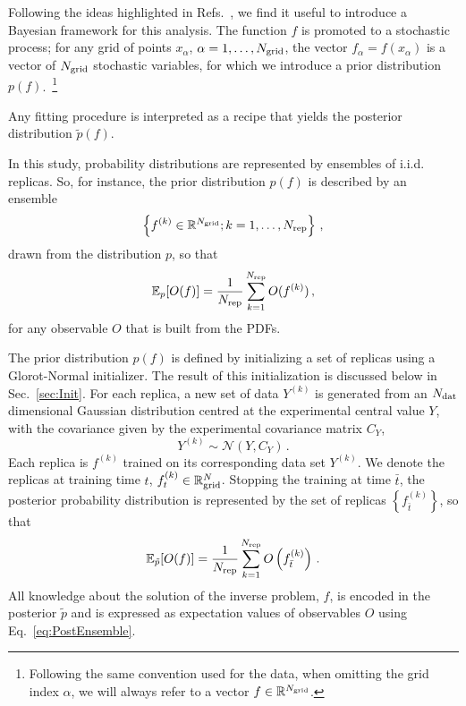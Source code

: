 \documentclass[11pt]{article}
\begin{document}
Following the ideas highlighted in Refs.~\cite{DelDebbio:2021whr,Candido:2024hjt}, we find it 
useful to introduce a Bayesian
framework for this analysis. The function $f$ is promoted to a stochastic process; for any grid 
of points $x_{\alpha}$, $\alpha=1, \ldots, N_{\mathrm{grid}}$, the vector $f_{\alpha}=f(x_{\alpha})$ is a 
vector of $N_{\mathrm{grid}}$ stochastic variables, for which we introduce a prior distribution $p(f)$.~\footnote{Following
the same convention used for the data, when omitting the grid index $\alpha$, we will always refer to a 
vector $f \in \mathbb{R}^{N_{\mathrm{grid}}}$.}

Any fitting procedure is interpreted as a recipe that yields the posterior distribution
$\tilde{p}(f)$.

In this study, probability distributions are represented by ensembles of i.i.d. replicas.
So, for instance, the prior distribution $p(f)$ is described by an ensemble 
\begin{equation}
    \label{eq:RepDef}
    \left\{f^{(k)} \in \mathbb{R}^{N_{\mathrm{grid}}}; k=1, \ldots, N_{\rm rep}\right\}\, ,
\end{equation}
drawn from the distribution $p$, so that 
\begin{equation}
    \label{eq:ReplicaEnsemble}
    \mathbb{E}_{p}[O(f)] = \frac{1}{N_{\rm rep}} \sum_{k=1}^{N_{\rm rep}} O(f^{(k)})\, ,
\end{equation}
for any observable $O$ that is built from the PDFs. 

The prior distribution $p(f)$ is defined by initializing a set of replicas using a Glorot-Normal initializer. 
The result of this initialization is discussed below in Sec.~\ref{sec:Init}.
For each replica, a new set of data $Y^{(k)}$ is generated from an $N_{\mathrm{dat}}$ dimensional Gaussian distribution
centred at the experimental central value $Y$, with the covariance given by the experimental covariance 
matrix $C_Y$, 
\begin{equation}
    \label{eq:ExpReplicaDistr}
    Y^{(k)} \sim \mathcal{N}\left(Y, C_Y\right)\, .
\end{equation}
Each replica is $f^{(k)}$ trained on its corresponding data set $Y^{(k)}$. We denote the replicas at training time $t$, 
$f^{(k)}_{t} \in \mathbb{R}^N_{\mathrm{grid}}$. Stopping the training at time $\bar{t}$, the posterior probability 
distribution is represented by the set of replicas $\left\{f^{(k)}_{\bar{t}}\right\}$, so that
\begin{equation}
    \label{eq:PostEnsemble}
    \mathbb{E}_{\tilde{p}}[O(f)] = \frac{1}{N_{\rm rep}} \sum_{k=1}^{N_{\rm rep}} 
        O\left(f^{(k)}_{\bar{t}}\right)\, .
\end{equation}
All knowledge about the solution of the inverse problem, $f$, is encoded in the posterior 
$\tilde{p}$ and is expressed as expectation values of observables $O$ using 
Eq.~\eqref{eq:PostEnsemble}. 
\end{document}
